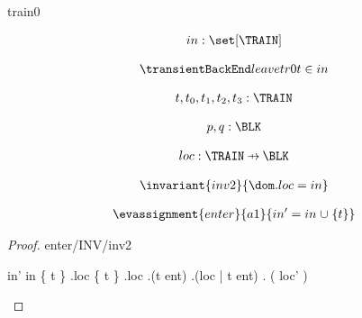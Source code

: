 \documentclass[12pt]{amsart}
\title{}
\author{}
\date{} %
\begin{document}
\maketitle
\tableofcontents


\begin{machine}{train0}


%
	\begin{align*}
\variable{		in : \set[\TRAIN]}
	\end{align*}
%



\begin{align*}
\transient{leave}{tr0}
{	t \in in	}
\end{align*}

\begin{align*}
\dummy{	t,t_0,t_1,t_2,t_3 : \TRAIN}
\end{align*}

\begin{align*}
\dummy{	p,q : \BLK}
\end{align*}


\begin{align*}
\variable{	loc : \TRAIN \pfun \BLK}
\end{align*}

\begin{align*}
\invariant{inv2}
{	\dom . loc = in	}
\end{align*}

\begin{align*}
\evassignment{enter}{a1}
{	in' = in \bunion \{ t \}	}
\end{align*}

\begin{proof}{enter/INV/inv2}
	\begin{calculation}
		in'
	\hint{=}{ \ref{a1} }
		in \bunion \{ t \}
	\hint{=}{ \ref{inv2} }
		\dom.loc \bunion \{ t \}
		\dom.loc \bunion \dom.(t \fun ent)
		\dom.(loc   |   t \fun ent)
	\hint{=}{ \ref{a2} }
		\dom. ( loc' )
	\end{calculation}
\end{proof}


\end{machine}
\end{document}

